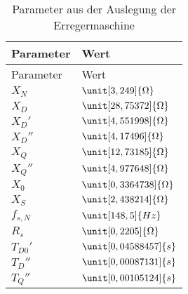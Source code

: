 \begin{longtable}[]{@{}ll@{}}
\caption{Parameter aus der Auslegung der Erregermaschine}\tabularnewline
\toprule
Parameter & Wert\tabularnewline
\midrule
\endfirsthead
\toprule
Parameter & Wert\tabularnewline
\midrule
\endhead
\(X_N\) & \(\unit[3,249]{\Omega}\)\tabularnewline
\(X_D\) & \(\unit[28,75372]{\Omega}\)\tabularnewline
\(X_D'\) & \(\unit[4,551998]{\Omega}\)\tabularnewline
\(X_D''\) & \(\unit[4,17496]{\Omega}\)\tabularnewline
\(X_Q\) & \(\unit[12,73185]{\Omega}\)\tabularnewline
\(X_Q''\) & \(\unit[4,977648]{\Omega}\)\tabularnewline
\(X_0\) & \(\unit[0,3364738]{\Omega}\)\tabularnewline
\(X_S\) & \(\unit[2,438214]{\Omega}\)\tabularnewline
\(f_{s,N}\) & \(\unit[148,5]{Hz}\)\tabularnewline
\(R_s\) & \(\unit[0,2205]{\Omega}\)\tabularnewline
\(T_{D0}'\) & \(\unit[0,04588457]{s}\)\tabularnewline
\(T_D''\) & \(\unit[0,00087131]{s}\)\tabularnewline
\(T_Q''\) & \(\unit[0,00105124]{s}\)\tabularnewline
\bottomrule
\end{longtable}

